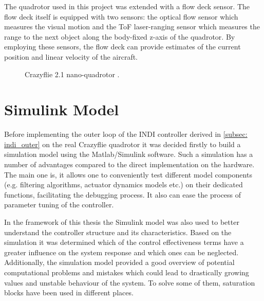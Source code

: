 \documentclass[11pt, a4paper, twoside]{report}
\begin{document}
The quadrotor used in this project was extended with a flow deck sensor. The flow deck itself is equipped with two sensors: the optical flow sensor which measures the visual motion and the \acrfull{ToF} laser-ranging sensor which measures the range to the next object along the body-fixed z-axis of the quadrotor. By employing these sensors, the flow deck can provide estimates of the current position and linear velocity of the aircraft.

\begin{figure}[H]
	\centering 
	\captionsetup{justification=centering, singlelinecheck=off, font=bf, belowskip=-0.5cm}
	\caption[Crazyflie 2.1 nano-quadrotor]{Crazyflie 2.1 nano-quadrotor \cite{bitcraze}.}
	\label{fig:crazyflie_drone}
\end{figure}

\section{Simulink Model} \label{sec:simulink_model}

Before implementing the outer loop of the \acrshort{INDI} controller derived in \ref{subsec: indi_outer} on the real Crazyflie quadrotor it was decided firstly to build a simulation model using the Matlab/Simulink software. Such a simulation has a number of advantages compared to the direct implementation on the hardware. The main one is, it allows one to conveniently test different model components (e.g. filtering algorithms, actuator dynamics models etc.) on their dedicated functions, facilitating the debugging process. It also can ease the process of parameter tuning of the controller. 

In the framework of this thesis the Simulink model was also used to better understand the controller structure and its characteristics. Based on the simulation it was determined which of the control effectiveness terms have a greater influence on the system response and which ones can be neglected. Additionally, the simulation model provided a good overview of potential computational problems and mistakes which could lead to drastically growing values and unstable behaviour of the system. To solve some of them, saturation blocks have been used  in different places.
\end{document}
